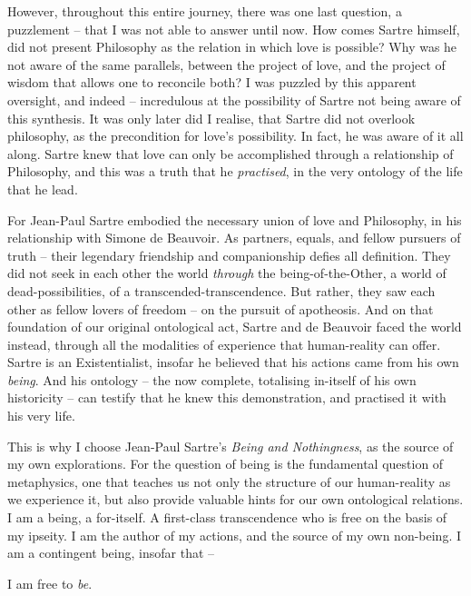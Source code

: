 However, throughout this entire journey, there was one last question, a puzzlement -- that I was not able to answer until now. How comes Sartre himself, did not present Philosophy as the relation in which love is possible? Why was he not aware of the same parallels, between the project of love, and the project of wisdom that allows one to reconcile both? I was puzzled by this apparent oversight, and indeed -- incredulous at the possibility of Sartre not being aware of this synthesis. It was only later did I realise, that Sartre did not overlook philosophy, as the precondition for love's possibility. In fact, he was aware of it all along. Sartre knew that love can only be accomplished through a relationship of Philosophy, and this was a truth that he \emph{practised}, in the very ontology of the life that he lead.

For Jean-Paul Sartre embodied the necessary union of love and Philosophy, in his relationship with Simone de Beauvoir. As partners, equals, and fellow pursuers of truth -- their legendary friendship and companionship defies all definition. They did not seek in each other the world \emph{through} the being-of-the-Other, a world of dead-possibilities, of a transcended-transcendence. But rather, they saw each other as fellow lovers of freedom -- on the pursuit of apotheosis. And on that foundation of our original ontological act, Sartre and de Beauvoir faced the world instead, through all the modalities of experience that human-reality can offer. Sartre is an Existentialist, insofar he believed that his actions came from his own \emph{being}. And his ontology -- the now complete, totalising in-itself of his own historicity -- can testify that he knew this demonstration, and practised it with his very life.

This is why I choose Jean-Paul Sartre's \emph{Being and Nothingness}, as the source of my own explorations. For the question of being is the fundamental question of metaphysics, one that teaches us not only the structure of our human-reality as we experience it, but also provide valuable hints for our own ontological relations. I am a being, a for-itself. A first-class transcendence who is free on the basis of my ipseity. I am the author of my actions, and the source of my own non-being. I am a contingent being, insofar that --

\noindent
I am free to \emph{be}.